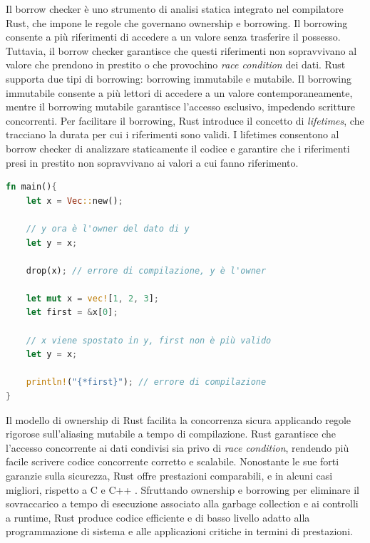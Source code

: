 Il borrow checker è uno strumento di analisi statica integrato nel compilatore Rust, che impone le regole che governano ownership e borrowing. Il borrowing consente a più riferimenti di accedere a un valore senza trasferire il possesso. Tuttavia, il borrow checker garantisce che questi riferimenti non sopravvivano al valore che prendono in prestito o che provochino \textit{race condition} dei dati. Rust supporta due tipi di borrowing: borrowing immutabile e mutabile. Il borrowing immutabile consente a più lettori di accedere a un valore contemporaneamente, mentre il borrowing mutabile garantisce l'accesso esclusivo, impedendo scritture concorrenti. Per facilitare il borrowing, Rust introduce il concetto di \textit{lifetimes}, che tracciano la durata per cui i riferimenti sono validi. I lifetimes consentono al borrow checker di analizzare staticamente il codice e garantire che i riferimenti presi in prestito non sopravvivano ai valori a cui fanno riferimento.

\newpage
\vspace{5mm}
\begin{lstlisting}[language=Rust, caption=Controllo dei puntatori in fase di compilazione, label=lis:rust_borrow_checker]
fn main(){
    let x = Vec::new();

    // y ora è l'owner del dato di y
    let y = x;

    drop(x); // errore di compilazione, y è l'owner

    let mut x = vec![1, 2, 3];
    let first = &x[0];

    // x viene spostato in y, first non è più valido
    let y = x;

    println!("{*first}"); // errore di compilazione
}
\end{lstlisting}
\vspace{5mm}

Il modello di ownership di Rust facilita la concorrenza sicura applicando regole rigorose sull'aliasing mutabile a tempo di compilazione. Rust garantisce che l'accesso concorrente ai dati condivisi sia privo di \textit{race condition}, rendendo più facile scrivere codice concorrente corretto e scalabile.
Nonostante le sue forti garanzie sulla sicurezza, Rust offre prestazioni comparabili, e in alcuni casi migliori, rispetto a C e C++ \cite[]{Rust:bench}. Sfruttando ownership e borrowing per eliminare il sovraccarico a tempo di esecuzione associato alla garbage collection e ai controlli a runtime, Rust produce codice efficiente e di basso livello adatto alla programmazione di sistema e alle applicazioni critiche in termini di prestazioni.

